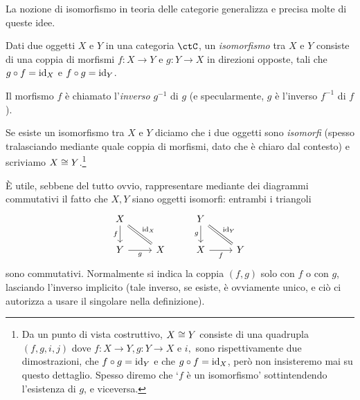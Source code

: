 La nozione di isomorfismo in teoria delle categorie generalizza e precisa molte di queste idee.
\begin{definition}[Isomorfismo]\label{def_isomorfismo}
	Dati due oggetti \(X\) e \(Y\) in una categoria \(\ctC\), un \emph{isomorfismo} tra \(X\) e \(Y\) consiste di una coppia di morfismi \(f:X\to Y\) e \(g:Y\to X\) in direzioni opposte, tali che \(g\circ f=\mathrm{id}_X\) e \(f\circ g=\mathrm{id}_Y\).

	Il morfismo \(f\) è chiamato l'\emph{inverso} \(g^{-1}\) di \(g\) (e specularmente, \(g\) è l'inverso \(f^{-1}\) di \(f\)).

	Se esiste un isomorfismo tra \(X\) e \(Y\) diciamo che i due oggetti sono \emph{isomorfi} (spesso tralasciando mediante quale coppia di morfismi, dato che è chiaro dal contesto) e scriviamo \(X\cong Y\).\footnote{Da un punto di vista costruttivo, \(X\cong Y\) consiste di una quadrupla \((f,g, i,j)\) dove \(f : X\to Y, g: Y\to X\) e \(i,\) sono rispettivamente due dimostrazioni, che \(f\circ g= \mathrm{id}_Y\) e che \(g\circ f=\mathrm{id}_X\), però non insisteremo mai su questo dettaglio. Spesso diremo che `\(f\) è un isomorfismo' sottintendendo l'esistenza di \(g\), e viceversa.}
\end{definition}
\`E utile, sebbene del tutto ovvio, rappresentare mediante dei diagrammi commutativi il fatto che \(X,Y\) siano oggetti isomorfi: entrambi i triangoli
\[
	\begin{tikzcd}
		X\ar[d, "f"'] \ar[dr, equal, "\id_X"]& & Y \ar[dr, equal, "\id_Y"]\ar[d,"g"']\\
		Y \ar[r, "g"']& X & X \ar[r, "f"']& Y
	\end{tikzcd}
\]
sono commutativi. Normalmente si indica la coppia \((f,g)\) solo con \(f\) o con \(g\), lasciando l'inverso implicito (tale inverso, se esiste, è ovviamente unico, e ciò ci autorizza a usare il singolare nella definizione).
